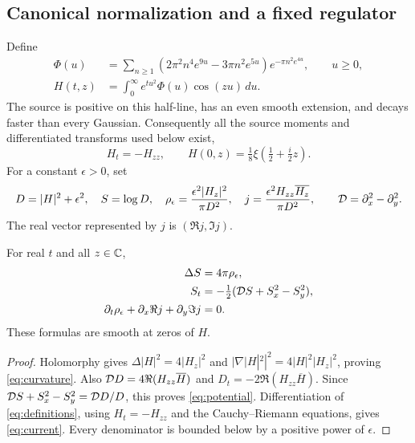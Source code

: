 \subsection{Canonical normalization and a fixed regulator}
Define
\begin{align}
 \Phi(u)&=\sum_{n\ge1}
 (2\pi^2n^4e^{9u}-3\pi n^2e^{5u})e^{-\pi n^2e^{4u}},\qquad u\ge0,
 \label{eq:phi}\\
 H(t,z)&=\int_0^\infty e^{tu^2}\Phi(u)\cos(zu)\,du .
 \label{eq:H}
\end{align}
The source is positive on this half-line, has an even smooth extension,
and decays faster than every Gaussian. Consequently all the source
moments and differentiated transforms used below exist,
\begin{equation}
 H_t=-H_{zz},\qquad
 H(0,z)=\tfrac18\xi(\tfrac12+\tfrac i2z).
 \label{eq:heat}
\end{equation}
For a constant $\epsilon>0$, set
\begin{equation}
 D=|H|^2+\epsilon^2,\quad S=\log D,\quad
 \rho_\epsilon=\frac{\epsilon^2|H_z|^2}{\pi D^2},\quad
 j=\frac{\epsilon^2H_{zz}\overline{H_z}}{\pi D^2},
 \qquad \mathcal D=\partial_x^2-\partial_y^2.
 \label{eq:definitions}
\end{equation}
The real vector represented by $j$ is $(\Re j,\Im j)$.

\begin{proposition}\label{prop:exact}
For real $t$ and all $z\in\mathbb C$,
\begin{align}
 \Delta S&=4\pi\rho_\epsilon, \label{eq:curvature}\\
 S_t&=-\tfrac12(\mathcal D S+S_x^2-S_y^2), \label{eq:potential}\\
 \partial_t\rho_\epsilon+\partial_x\Re j+\partial_y\Im j&=0. \label{eq:current}
\end{align}
These formulas are smooth at zeros of $H$.
\end{proposition}
\begin{proof}
Holomorphy gives $\Delta |H|^2=4|H_z|^2$ and
$|\nabla |H|^2|^2=4|H|^2|H_z|^2$, proving
\eqref{eq:curvature}. Also
$\mathcal D D=4\Re(H_{zz}\overline H)$ and
$D_t=-2\Re(H_{zz}\overline H)$.
Since $\mathcal D S+S_x^2-S_y^2=\mathcal D D/D$, this proves
\eqref{eq:potential}. Differentiation of \eqref{eq:definitions},
using $H_t=-H_{zz}$ and the Cauchy--Riemann equations, gives
\eqref{eq:current}. Every denominator is bounded below by a positive
power of $\epsilon$.
\end{proof}

